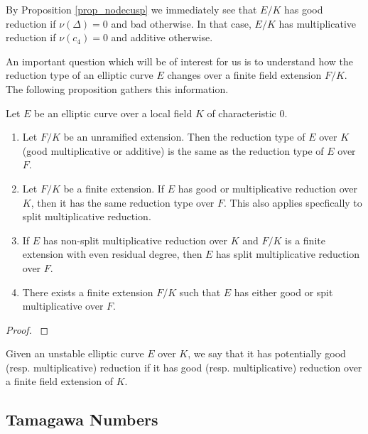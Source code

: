 By Proposition \ref*{prop_nodecusp} we immediately see that $E/K$ has good reduction if $\nu(\Delta)=0$ and bad otherwise. In that case, $E/K$ has multiplicative reduction if $\nu(c_4)=0$ and additive otherwise.

An important question which will be of interest for us is to understand how the reduction type of an elliptic curve $E$ changes over a finite field extension $F/K$. The following proposition gathers this information.

\begin{prop}
    Let $E$ be an elliptic curve over a local field $K$ of characteristic $0$. 
    \begin{enumerate}[label={(\roman*)}]
        \item Let $F/K$ be an unramified extension. Then the reduction type of $E$ over $K$ (good multiplicative or additive) is the same as the reduction type of $E$ over $F$.
        \item Let $F/K$ be a finite extension. If $E$ has good or multiplicative reduction over $K$, then it has the same reduction type over $F$. This also applies specfically to split multiplicative reduction.
        \item If $E$ has non-split multiplicative reduction over $K$ and $F/K$ is a finite extension with even residual degree, then $E$ has split multiplicative reduction over $F$. 
        \item There exists a finite extension $F/K$ such that $E$ has either good or spit multiplicative over $F$.
    \end{enumerate}
\end{prop}
\begin{proof}
    \cite[\S VII Proposition 5.4]{S1} 
\end{proof}

Given an unstable elliptic curve $E$ over $K$, we say that it has potentially good (resp. multiplicative) reduction if it has good (resp. multiplicative) reduction over a finite field extension of $K$.

\subsection{Tamagawa Numbers} \label{subs_tamagawa}

